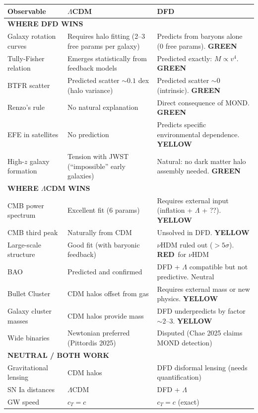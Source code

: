 \documentclass[11pt,a4paper]{article}
\newcommand{\GREEN}{\textcolor{dfdgreen}{\textbf{GREEN}}}
\newcommand{\YELLOW}{\textcolor{dfdyellow}{\textbf{YELLOW}}}
\newcommand{\RED}{\textcolor{dfdred}{\textbf{RED}}}
\begin{document}
\begin{center}
\begin{longtable}{p{4cm}p{4.5cm}p{4.5cm}}
\toprule
\textbf{Observable} & \textbf{$\Lambda$CDM} & \textbf{DFD} \\
\midrule
\endhead
\multicolumn{3}{l}{\textbf{WHERE DFD WINS}} \\
\midrule
Galaxy rotation curves & Requires halo fitting (2--3 free params per galaxy) & Predicts from baryons alone (0 free params). \GREEN \\
\midrule
Tully-Fisher relation & Emerges statistically from feedback models & Predicted exactly: $M \propto v^4$. \GREEN \\
\midrule
BTFR scatter & Predicted scatter $\sim 0.1$ dex (halo variance) & Predicted scatter $\sim 0$ (intrinsic). \GREEN \\
\midrule
Renzo's rule & No natural explanation & Direct consequence of MOND. \GREEN \\
\midrule
EFE in satellites & No prediction & Predicts specific environmental dependence. \YELLOW \\
\midrule
High-$z$ galaxy formation & Tension with JWST (``impossible'' early galaxies) & Natural: no dark matter halo assembly needed. \GREEN \\
\midrule
\multicolumn{3}{l}{\textbf{WHERE $\Lambda$CDM WINS}} \\
\midrule
CMB power spectrum & Excellent fit (6 params) & Requires external input (inflation + $\Lambda$ + ??). \YELLOW \\
\midrule
CMB third peak & Naturally from CDM & Unsolved in DFD. \YELLOW \\
\midrule
Large-scale structure & Good fit (with baryonic feedback) & $\nu$HDM ruled out ($> 5\sigma$). \RED\ for $\nu$HDM \\
\midrule
BAO & Predicted and confirmed & DFD + $\Lambda$ compatible but not predictive. Neutral \\
\midrule
Bullet Cluster & CDM halos offset from gas & Requires external mass or new physics. \YELLOW \\
\midrule
Galaxy cluster masses & CDM halos provide mass & DFD underpredicts by factor $\sim 2$--$3$. \YELLOW \\
\midrule
Wide binaries & Newtonian preferred (Pittordis 2025) & Disputed (Chae 2025 claims MOND detection) \\
\midrule
\multicolumn{3}{l}{\textbf{NEUTRAL / BOTH WORK}} \\
\midrule
Gravitational lensing & CDM halos & DFD disformal lensing (needs quantification) \\
\midrule
SN Ia distances & $\Lambda$CDM & DFD + $\Lambda$ \\
\midrule
GW speed & $c_T = c$ & $c_T = c$ (exact) \\
\bottomrule
\end{longtable}
\end{center}
\end{document}
